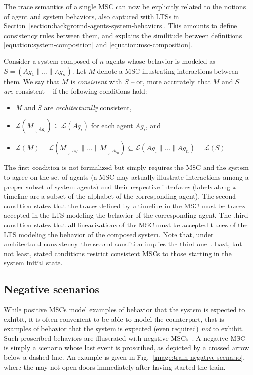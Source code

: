 The trace semantics of a single MSC can now be explicitly related to the notions of agent and system behaviors, also captured with LTSs in Section~\ref{section:background-agents-system-behaviors}. This amounts to define consistency rules between them, and explains the similitude between definitions \ref{equation:system-composition} and \ref{equation:msc-composition}.

Consider a system composed of $n$ agents whose behavior is modeled as $S = (Ag_1 \parallel \ldots \parallel Ag_n)$. Let $M$ denote a MSC illustrating interactions between them. We say that $M$ is \emph{consistent} with $S$ -- or, more accurately, that $M$ and $S$ \emph{are} consistent -- if the following conditions hold:

\begin{itemize}
\item $M$ and $S$ are \emph{architecturally} consistent,
\item $\mathcal{L}(M_{\downarrow Ag_i}) \subseteq \mathcal{L}(Ag_i)$ for each agent $Ag_i$, and
\item $\mathcal{L}(M) = \mathcal{L}(M_{\downarrow Ag_1} \parallel \ldots \parallel M_{\downarrow Ag_n}) \subseteq \mathcal{L}(Ag_1 \parallel \ldots \parallel Ag_n) = \mathcal{L}(S)$
\end{itemize}

The first condition is not formalized but simply requires the MSC and the system to agree on the set of agents (a MSC may actually illustrate interactions among a proper subset of system agents) and their respective interfaces (labels along a timeline are a subset of the alphabet of the corresponding agent). The second condition states that the traces defined by a timeline in the MSC must be traces accepted in the LTS modeling the behavior of the corresponding agent. The third condition states that all linearizations of the MSC must be accepted traces of the LTS modeling the behavior of the composed system. Note that, under architectural consistency, the second condition implies the third one~\cite{Uchitel:2003}. Last, but not least, stated conditions restrict consistent MSCs to those starting in the system initial state.

\subsection{Negative scenarios}

While positive MSCs model examples of behavior that the system is expected to exhibit, it is often convenient to be able to model the counterpart, that is examples of behavior that the system is expected (even required) \emph{not} to exhibit. Such proscribed behaviors are illustrated with negative MSCs~\cite{Uchitel:2004}. A negative MSC is simply a scenario whose last event is proscribed, as depicted by a crossed arrow below a dashed line. An example is given in Fig.~\ref{image:train-negative-scenario}, where the  may not open doors immediately after having started the train.

